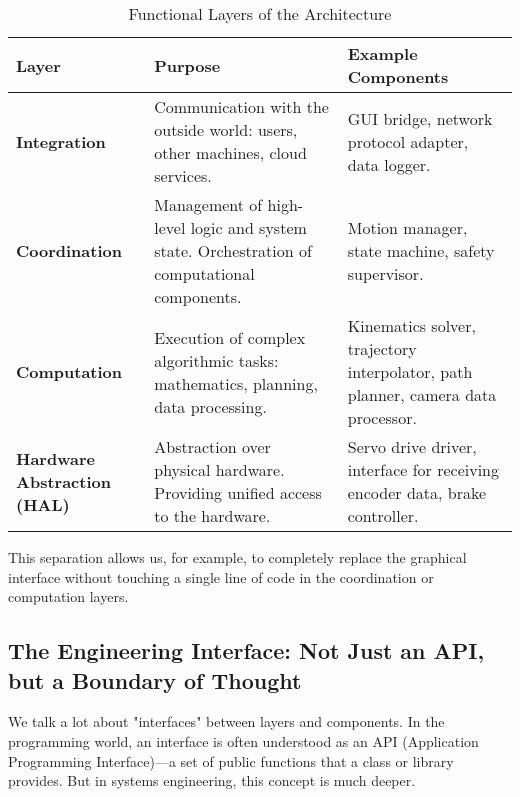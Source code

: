 \begin{table}[h!]
    \caption{Functional Layers of the Architecture}
    \label{tab:functional_layers}
    \centering
    \renewcommand{\arraystretch}{1.2}
    \begin{tabular}{p{} p{} p{}}
        \toprule %
        \textbf{Layer} & \textbf{Purpose} & \textbf{Example Components} \\
        \toprule %
        \textbf{Integration} & Communication with the outside world: users, other machines, cloud services. & GUI bridge, network protocol adapter, data logger. \\
        \midrule %
        \textbf{Coordination} & Management of high-level logic and system state. Orchestration of computational components. & Motion manager, state machine, safety supervisor. \\
        \midrule %
        \textbf{Computation} & Execution of complex algorithmic tasks: mathematics, planning, data processing. & Kinematics solver, trajectory interpolator, path planner, camera data processor. \\
        \midrule %
        \textbf{Hardware Abstraction (HAL)} & Abstraction over physical hardware. Providing unified access to the hardware. & Servo drive driver, interface for receiving encoder data, brake controller. \\
        \bottomrule %
    \end{tabular}
\end{table}

This separation allows us, for example, to completely replace the graphical interface without touching a single line of code in the coordination or computation layers.

\subsection{The Engineering Interface: Not Just an API, but a Boundary of Thought}

We talk a lot about "interfaces" between layers and components. In the programming world, an interface is often understood as an API (Application Programming Interface)—a set of public functions that a class or library provides. But in systems engineering, this concept is much deeper.


